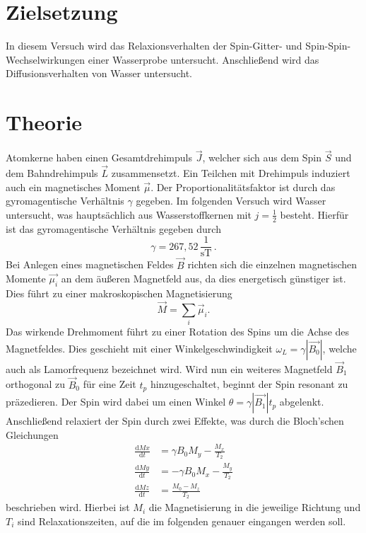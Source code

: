 \section{Zielsetzung}
In diesem Versuch wird das Relaxionsverhalten der Spin-Gitter- und Spin-Spin-Wechselwirkungen einer Wasserprobe untersucht.
Anschließend wird das Diffusionsverhalten von Wasser untersucht.
\section{Theorie}
Atomkerne haben einen Gesamtdrehimpuls $\vec{J}$, welcher sich aus dem Spin $\vec{S}$ und dem Bahndrehimpuls $\vec{L}$ zusammensetzt.
Ein Teilchen mit Drehimpuls induziert auch ein magnetisches Moment $\vec{\mu}$. Der Proportionalitätsfaktor ist durch das gyromagentische Verhältnis $\gamma$ gegeben.
Im folgenden Versuch wird Wasser untersucht, was hauptsächlich aus Wasserstoffkernen mit $ j = \frac{1}{2}$ besteht.
Hierfür ist das gyromagentische Verhältnis gegeben durch \cite{SciPy}
\begin{equation*}
    \gamma = 267,52 \, \frac{1}{\text{sT}} \, .
\end{equation*} 
Bei Anlegen eines magnetischen Feldes $\vec{B}$ richten sich die einzelnen magnetischen Momente $\vec{\mu_i}$ an dem äußeren Magnetfeld aus, da dies energetisch günstiger ist.
Dies führt zu einer makroskopischen Magnetisierung 
\begin{equation*}
    \vec{M} = \sum_i \vec{\mu}_i.
\end{equation*}
Das wirkende Drehmoment führt zu einer Rotation des Spins um die Achse des Magnetfeldes. Dies geschieht mit einer Winkelgeschwindigkeit $\omega_L = \gamma |\vec{B_0}|$, welche auch als Lamorfrequenz bezeichnet wird.
Wird nun ein weiteres Magnetfeld $\vec{B}_1 $ orthogonal zu $\vec{B}_0$ für eine Zeit $t_p$ hinzugeschaltet, beginnt der Spin resonant zu präzedieren. 
Der Spin wird dabei um einen Winkel $\theta = \gamma |\vec{B_1}| t_p$ abgelenkt. Anschließend relaxiert der Spin durch zwei Effekte, was durch die Bloch'schen Gleichungen 
\begin{align}
    \frac{\mathrm{d}Mx}{\mathrm{d}t} &= \gamma B_0 M_y - \frac{M_x}{T_2} \\  
    \frac{\mathrm{d}My}{\mathrm{d}t} &= -\gamma B_0 M_x - \frac{M_y}{T_2} \\   
    \frac{\mathrm{d}Mz}{\mathrm{d}t} &=  \frac{M_0 - M_z}{T_2} 
\end{align}  
beschrieben wird.
Hierbei ist $M_i $ die Magnetisierung in die jeweilige Richtung und $T_i$ sind Relaxationszeiten, auf die im folgenden genauer eingangen werden soll.
